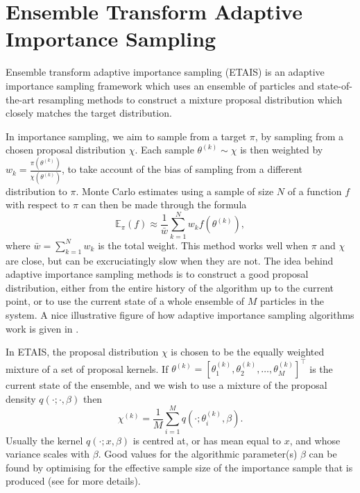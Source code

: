 \documentclass[final]{siamltex}
\newcommand{\edit}[1]{#1}
\begin{document}
\section{Ensemble Transform Adaptive Importance Sampling}\label{sec:ETAIS}
Ensemble transform adaptive importance sampling
(ETAIS)\cite{cotter2015parallel} is an adaptive importance sampling framework
which uses an ensemble of particles and state-of-the-art resampling
methods to construct a mixture proposal distribution which closely
matches the target distribution. 

In importance sampling, we aim to sample from a target $\pi$, by
sampling from a chosen proposal distribution $\chi$. Each sample $\theta^{(k)} \sim \chi$ is then weighted by
$w_k = \frac{\pi(\theta^{(k)})}{\chi(\theta^{(k)})}$, to take account of the bias of
sampling from a different distribution to $\pi$. Monte Carlo estimates
using a sample of size $N$
of a function $f$ with respect to $\pi$ can then be made through the
formula
\begin{equation} \mathbb{E}_\pi(f) \approx \frac{1}{\bar{w}} \sum_{k=1}^N
  w_kf(\theta^{(k)}),\end{equation}
where $\bar{w} = \sum_{k=1}^N w_k$ is the total weight.
This method works well when $\pi$ and $\chi$ are close, but can be
excruciatingly slow when they are not. The idea behind adaptive
importance sampling methods is
to construct a good proposal distribution, either from the entire
history of the algorithm up to the current point, or to use the
current state of a whole ensemble of $M$ particles in the system.  \edit{A nice illustrative figure of how adaptive
  importance sampling algorithms work is given in \cite{bugallo2017adaptive}.}

In ETAIS, the proposal distribution $\chi$ is chosen to be the equally
weighted mixture of a set of proposal kernels. If $\theta^{(k)} = [\theta_1^{(k)},
\theta_2^{(k)}, \ldots, \theta_M^{(k)}]^\top$ is the current state of the
ensemble, and we wish to use a mixture of the proposal density $q(\cdot ;
\cdot, \beta)$ then 
\begin{equation}\chi^{(k)} = \frac{1}{M} \sum_{i=1}^M q(\cdot ; \theta_i^{(k)},
\beta).\end{equation}
Usually the kernel $q(\cdot ;
x,\beta)$ is centred at, or has mean equal to $x$, and whose variance
scales with $\beta$. Good values for the
algorithmic parameter(s) $\beta$ can be
found by optimising for the effective sample size of the importance
sample that is produced (see \cite{cotter2015parallel, russ2017parallel} for more details).
\end{document}
